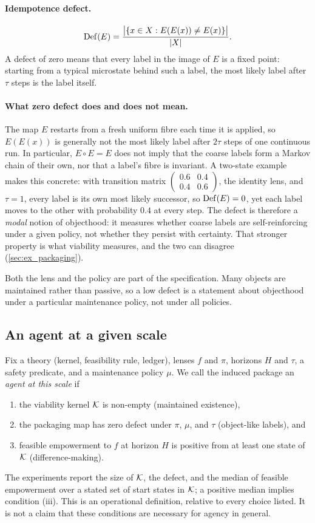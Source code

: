 \paragraph{Idempotence defect.}
\[
\mathrm{Def}(E) = \frac{\bigl|\{x\in X : E(E(x))\neq E(x)\}\bigr|}{|X|}.
\]
A defect of zero means that every label in the image of $E$ is a fixed point: starting from a typical microstate behind such a label, the most likely label after $\tau$ steps is the label itself.

\paragraph{What zero defect does and does not mean.}
The map $E$ restarts from a fresh uniform fibre each time it is applied, so $E(E(x))$ is generally not the most likely label after $2\tau$ steps of one continuous run. In particular, $E\circ E=E$ does not imply that the coarse labels form a Markov chain of their own, nor that a label's fibre is invariant. A two-state example makes this concrete: with transition matrix $\left(\begin{smallmatrix}0.6&0.4\\0.4&0.6\end{smallmatrix}\right)$, the identity lens, and $\tau=1$, every label is its own most likely successor, so $\mathrm{Def}(E)=0$, yet each label moves to the other with probability $0.4$ at every step. The defect is therefore a \emph{modal} notion of objecthood: it measures whether coarse labels are self-reinforcing under a given policy, not whether they persist with certainty. That stronger property is what viability measures, and the two can disagree (\cref{sec:ex_packaging}).

Both the lens and the policy are part of the specification. Many objects are maintained rather than passive, so a low defect is a statement about objecthood under a particular maintenance policy, not under all policies.

\subsection{An agent at a given scale}
Fix a theory (kernel, feasibility rule, ledger), lenses $f$ and $\pi$, horizons $H$ and $\tau$, a safety predicate, and a maintenance policy $\mu$. We call the induced package an \emph{agent at this scale} if
\begin{enumerate}[label=(\roman*), leftmargin=*, itemsep=0.2em]
  \item the viability kernel $\mathcal{K}$ is non-empty (maintained existence),
  \item the packaging map has zero defect under $\pi$, $\mu$, and $\tau$ (object-like labels), and
  \item feasible empowerment to $f$ at horizon $H$ is positive from at least one state of $\mathcal{K}$ (difference-making).
\end{enumerate}
The experiments report the size of $\mathcal{K}$, the defect, and the median of feasible empowerment over a stated set of start states in $\mathcal{K}$; a positive median implies condition (iii). This is an operational definition, relative to every choice listed. It is not a claim that these conditions are necessary for agency in general.

